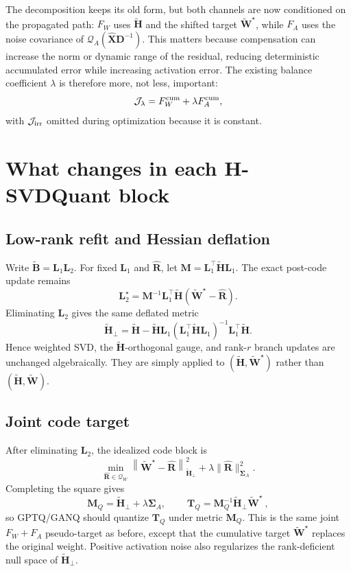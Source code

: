 \documentclass[11pt]{article}
\newcommand{\Xh}{\widehat{\bm X}}
\newcommand{\W}{\bm W}
\newcommand{\D}{\bm D}
\newcommand{\B}{\bm B}
\newcommand{\Rh}{\widehat{\bm R}}
\newcommand{\Ht}{\widetilde{\bm H}}
\newcommand{\SigA}{\bm\Sigma_A}
\newcommand{\Qa}{\mathcal Q_A}
\begin{document}
The decomposition keeps its old form, but both channels are now conditioned on
the propagated path: $F_W$ uses $\Ht$ and the shifted target
$\widetilde{\W}^{\star}$, while $F_A$ uses the noise covariance of
$\Qa(\Xh\D^{-1})$.  This matters because compensation can increase the norm or
dynamic range of the residual, reducing deterministic accumulated error while
increasing activation error.  The existing balance coefficient $\lambda$ is
therefore more, not less, important:
\begin{equation}\label{eq:lambda}
  \mathcal J_\lambda
  =F_W^{\rm cum}+\lambda F_A^{\rm cum},
\end{equation}
with $\mathcal J_{\rm irr}$ omitted during optimization because it is constant.

\section{What changes in each H-SVDQuant block}

\subsection{Low-rank refit and Hessian deflation}

Write $\widetilde{\B}=\bm L_1\bm L_2$.  For fixed $\bm L_1$ and $\Rh$, let
$\bm M=\bm L_1^\top\Ht\bm L_1$.  The exact post-code update remains
\begin{equation}\label{eq:l2}
  \bm L_2^\star
  =\bm M^{-1}\bm L_1^\top\Ht
   (\widetilde{\W}^{\star}-\Rh).
\end{equation}
Eliminating $\bm L_2$ gives the same deflated metric
\begin{equation}\label{eq:hperp}
  \Ht_\perp
  =\Ht-\Ht\bm L_1
   (\bm L_1^\top\Ht\bm L_1)^{-1}
   \bm L_1^\top\Ht.
\end{equation}
Hence weighted SVD, the $\Ht$-orthogonal gauge, and rank-$r$ branch updates are
unchanged algebraically.  They are simply applied to
$(\Ht,\widetilde{\W}^{\star})$ rather than
$(\widetilde{\bm H},\widetilde{\W})$.

\subsection{Joint code target}

After eliminating $\bm L_2$, the idealized code block is
\begin{equation}\label{eq:code}
  \min_{\Rh\in\mathcal Q_W}
  \left\|\widetilde{\W}^{\star}-\Rh\right\|_{\Ht_\perp}^2
  +\lambda\|\Rh\|_{\SigA}^2.
\end{equation}
Completing the square gives
\begin{equation}\label{eq:pseudotarget}
  \bm M_Q=\Ht_\perp+\lambda\SigA,
  \qquad
  \boxed{\ \bm T_Q=\bm M_Q^{-1}\Ht_\perp\widetilde{\W}^{\star}\ },
\end{equation}
so GPTQ/GANQ should quantize $\bm T_Q$ under metric $\bm M_Q$.  This is the
same joint $F_W+F_A$ pseudo-target as before, except that the cumulative target
$\widetilde{\W}^{\star}$ replaces the original weight.  Positive activation
noise also regularizes the rank-deficient null space of $\Ht_\perp$.
\end{document}
